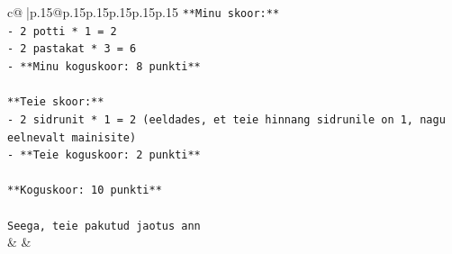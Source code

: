 \documentclass{article}
\begin{document}
{\begin{supertabular}{c@{$\;$}|p{.15\linewidth}@{}p{.15\linewidth}p{.15\linewidth}p{.15\linewidth}p{.15\linewidth}p{.15\linewidth}}
{{{\texttt{**Minu skoor:**} \\
\texttt{{-} 2 potti * 1 = 2} \\
\texttt{{-} 2 pastakat * 3 = 6} \\
\texttt{{-} **Minu koguskoor: 8 punkti**} \\
\\ 
\texttt{**Teie skoor:**} \\
\texttt{{-} 2 sidrunit * 1 = 2 (eeldades, et teie hinnang sidrunile on 1, nagu eelnevalt mainisite)} \\
\texttt{{-} **Teie koguskoor: 2 punkti**} \\
\\ 
\texttt{**Koguskoor: 10 punkti**} \\
\\ 
\texttt{Seega, teie pakutud jaotus ann} \\
            }
        }
    }
    & & \\ \\


\end{supertabular}}
\end{document}
